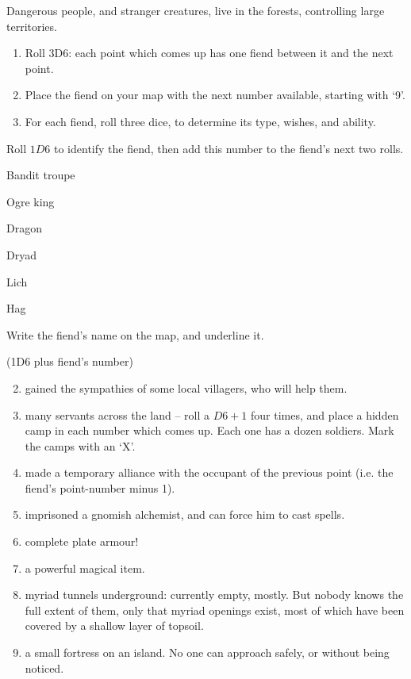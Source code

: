 \begin{multicols}{2}
\label{mapFiends}

Dangerous people, and stranger creatures, live in the forests, controlling large territories.

\begin{enumerate}
\item
  Roll 3D6: each point which comes up has one fiend between it and the
  next point.
\item
  Place the fiend on your map with the next number available, starting with `9'.
\item
  For each fiend, roll three dice, to determine its type, wishes, and
  ability.
\end{enumerate}


Roll $1D6$ to identify the fiend, then add this number to the fiend's next two rolls.

\begin{multicols}{2}
\begin{dlist}
\item
  Bandit troupe
\item
  Ogre king
\item
  Dragon
\item
  Dryad
\item
  Lich
\item
  Hag
\end{dlist}
\end{multicols}

Write the fiend's name on the map, and underline it.


(1D6 plus fiend's number)

\begin{enumerate}
\setcounter{enumi}{1}
\item
  gained the sympathies of some local villagers, who will help them.
\item
  many servants across the land -- roll a $D6 + 1$ four times, and place a hidden camp in each number which comes up.
  Each one has a dozen soldiers.
  Mark the camps with an `X'.
\item
  made a temporary alliance with the occupant of the previous point (i.e. the fiend's point-number minus 1).
\item
  imprisoned a gnomish alchemist, and can force him to cast spells.
\item
  complete plate armour!
\item
  a powerful magical item.
\item
  myriad tunnels underground: currently empty, mostly. But nobody knows
  the full extent of them, only that myriad openings exist, most of
  which have been covered by a shallow layer of topsoil.
\item
  a small fortress on an island. No one can approach safely, or without
  being noticed.


\end{enumerate}
\end{multicols}

